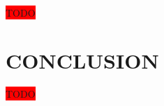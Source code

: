 \documentclass[letter, 12pt, conference]{ieeeconf}
\newcommand{\todo}{\colorbox{red}{TODO}}
\begin{document}
\todo

\section{CONCLUSION}

\todo



\printbibliography
\end{document}
